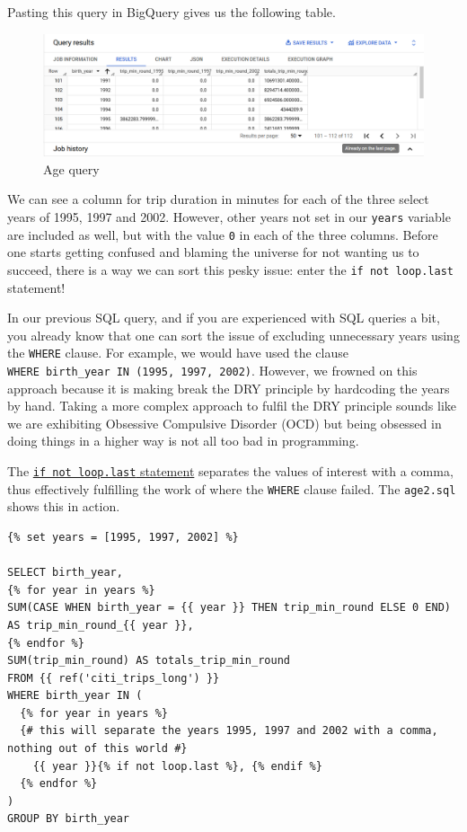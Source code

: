 \documentclass[
]{book}
\begin{document}
Pasting this query in BigQuery gives us the following table.

\begin{figure}
\centering
\includegraphics{./images/age_query.png}
\caption{Age query}
\end{figure}

We can see a column for trip duration in minutes for each of the three select years of 1995, 1997 and 2002. However, other years not set in our \texttt{years} variable are included as well, but with the value \texttt{0} in each of the three columns. Before one starts getting confused and blaming the universe for not wanting us to succeed, there is a way we can sort this pesky issue: enter the \texttt{if\ not\ loop.last} statement!

In our previous SQL query, and if you are experienced with SQL queries a bit, you already know that one can sort the issue of excluding unnecessary years using the \texttt{WHERE} clause. For example, we would have used the clause \texttt{WHERE\ birth\_year\ IN\ (1995,\ 1997,\ 2002)}. However, we frowned on this approach because it is making break the DRY principle by hardcoding the years by hand. Taking a more complex approach to fulfil the DRY principle sounds like we are exhibiting Obsessive Compulsive Disorder (OCD) but being obsessed in doing things in a higher way is not all too bad in programming.

The \href{https://docs.y42.com/docs/how-to-use-jinja}{\texttt{if\ not\ loop.last} statement} separates the values of interest with a comma, thus effectively fulfilling the work of where the \texttt{WHERE} clause failed. The \texttt{age2.sql} shows this in action.

\begin{verbatim}
{% set years = [1995, 1997, 2002] %}

SELECT birth_year, 
{% for year in years %}
SUM(CASE WHEN birth_year = {{ year }} THEN trip_min_round ELSE 0 END) AS trip_min_round_{{ year }},
{% endfor %}
SUM(trip_min_round) AS totals_trip_min_round
FROM {{ ref('citi_trips_long') }}
WHERE birth_year IN (
  {% for year in years %}
  {# this will separate the years 1995, 1997 and 2002 with a comma, nothing out of this world #}
    {{ year }}{% if not loop.last %}, {% endif %}
  {% endfor %}
)
GROUP BY birth_year
\end{verbatim}
\end{document}
